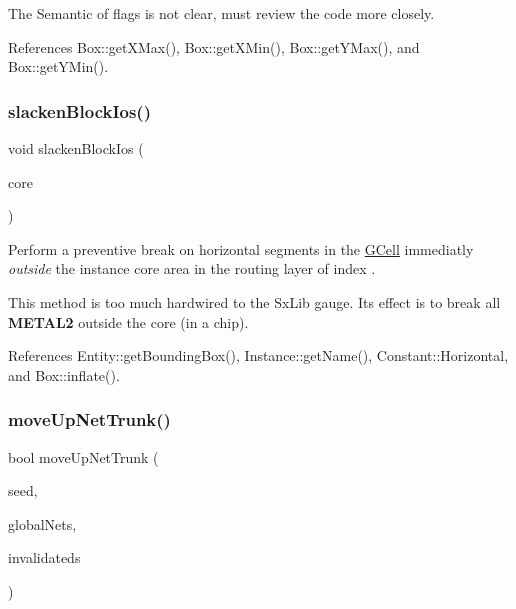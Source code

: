 The Semantic of {\ttfamily flags} is not clear, must review the code more closely. 

References Box\+::get\+X\+Max(), Box\+::get\+X\+Min(), Box\+::get\+Y\+Max(), and Box\+::get\+Y\+Min().

\mbox{\label{classKatabatic_1_1KatabaticEngine_ac40754d4a9bd0cf327b5fa088e993897}} 
\subsubsection{\texorpdfstring{slacken\+Block\+Ios()}{slackenBlockIos()}}
{\footnotesize\ttfamily void slacken\+Block\+Ios (\begin{DoxyParamCaption}\item[{\textbf{ Instance} $\ast$}]{core }\end{DoxyParamCaption})}

Perform a preventive break on horizontal segments in the \hyperlink{classKatabatic_1_1GCell}{G\+Cell} immediatly {\itshape outside} the instance {\ttfamily core} area in the routing layer of index {}.

This method is too much hardwired to the {\ttfamily Sx\+Lib} gauge. It\textquotesingle{}s effect is to break all {\bfseries M\+E\+T\+A\+L2} outside the core (in a chip). 

References Entity\+::get\+Bounding\+Box(), Instance\+::get\+Name(), Constant\+::\+Horizontal, and Box\+::inflate().

\mbox{\label{classKatabatic_1_1KatabaticEngine_ac934a049003c9d5d2380f44ff393e458}} 
\subsubsection{\texorpdfstring{move\+Up\+Net\+Trunk()}{moveUpNetTrunk()}}
{\footnotesize\ttfamily bool move\+Up\+Net\+Trunk (\begin{DoxyParamCaption}\item[{\hyperlink{classKatabatic_1_1AutoSegment}{Auto\+Segment} $\ast$}]{seed,  }\item[{set$<$ \textbf{ Net} $\ast$$>$ \&}]{global\+Nets,  }\item[{\hyperlink{classKatabatic_1_1GCell_aacb1c215b203bfba5729f135b3221d40}{G\+Cell\+::\+Set\+Index} \&}]{invalidateds }\end{DoxyParamCaption})}



